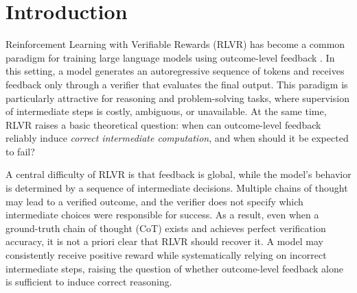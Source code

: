\documentclass{article}
\theoremstyle{plain}
\theoremstyle{definition}
\theoremstyle{remark}
\begin{document}
\begin{abstract}
  The emergence of compositional reasoning in large language models through reinforcement learning with verifiable rewards (RLVR) has been a key driver of recent empirical successes. Despite this progress, it remains unclear which compositional problems are learnable in this setting using outcome-level feedback alone. 
  In this work, we theoretically study the learnability of compositional problems in autoregressive models under RLVR training.
  We identify a quantity that we call the \emph{task-advantage ratio}, a joint property of the compositional problem and the base model, that characterizes which tasks and compositions are learnable from outcome-level feedback. 
  On the positive side, using this characterization, we show that compositional problems where correct intermediate steps provide a clear advantage are efficiently learnable with RLVR. 
  We also analyze how such an advantage naturally arises in different problems. On the negative side, when the structural advantage is not present, RLVR may converge to suboptimal compositions. We prove that, in some cases, the quality of the base model determines if such an advantage exists and whether RLVR will converge to a suboptimal solution. 
  We hope our analysis can provide a principled theoretical understanding of when and why RLVR succeeds and when it does not. 
\end{abstract}

\section{Introduction}
Reinforcement Learning with Verifiable Rewards (RLVR) has become a common paradigm for training large language models using outcome-level feedback \citep{jaech2024openai,guo2025deepseek,team2025kimi}. In this setting, a model generates an autoregressive sequence of tokens and receives feedback only through a verifier that evaluates the final output. This paradigm is particularly attractive for reasoning and problem-solving tasks, where supervision of intermediate steps is costly, ambiguous, or unavailable. At the same time, RLVR raises a basic theoretical question: when can outcome-level feedback reliably induce \emph{correct intermediate computation}, and when should it be expected to fail?

A central difficulty of RLVR is that feedback is global, while the model’s behavior is determined by a sequence of intermediate decisions. Multiple chains of thought may lead to a verified outcome, and the verifier does not specify which intermediate choices were responsible for success. As a result, even when a ground-truth chain of thought (CoT) exists and achieves perfect verification accuracy, it is not a priori clear that RLVR should recover it. A model may consistently receive positive reward while systematically relying on incorrect intermediate steps, raising the question of whether outcome-level feedback alone is sufficient to induce correct reasoning.
\end{document}
